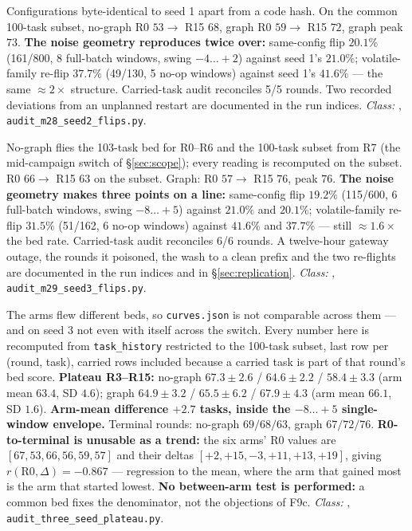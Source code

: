 \begin{description}[leftmargin=0pt,style=nextline,font=\normalfont,itemsep=6pt]
\item[\textbf{F44}\quad Replication, seed 2, both arms 16/16.]
Configurations byte-identical to seed 1 apart from a code hash. On the
common 100-task subset, no-graph R0 $53 \to$ R15 $68$, graph R0 $59 \to$
R15 $72$, graph peak $73$.
\textbf{The noise geometry reproduces twice over:} same-config
flip $20.1\%$ (161/800, 8 full-batch windows, swing $-4\ldots{+}2$)
against seed 1's $21.0\%$; volatile-family re-flip $37.7\%$ (49/130, 5
no-op windows) against seed 1's $41.6\%$ --- the same $\approx 2\times$
structure.
Carried-task audit reconciles 5/5 rounds. Two recorded deviations from an
unplanned restart are documented in the run indices.
\emph{Class:} , \texttt{audit\_m28\_seed2\_flips.py}.

\item[\textbf{F45}\quad Replication, seed 3, both arms 16/16.]
No-graph flies the 103-task bed for R0--R6 and the 100-task subset from R7
(the mid-campaign switch of \S\ref{sec:scope}); every reading is recomputed
on the subset. R0 $66 \to$ R15 $63$ on the subset. Graph: R0 $57 \to$ R15
$76$, peak $76$. \textbf{The noise geometry makes three points on a line:}
same-config flip $19.2\%$ (115/600, 6 full-batch windows, swing
$-8\ldots{+}5$) against $21.0\%$ and $20.1\%$; volatile-family re-flip
$31.5\%$ (51/162, 6 no-op windows) against $41.6\%$ and $37.7\%$ --- still
$\approx 1.6\times$ the bed rate. Carried-task audit reconciles 6/6 rounds.
A twelve-hour gateway outage, the rounds it poisoned, the wash to a clean
prefix and the two re-flights are documented in the run indices and in
\S\ref{sec:replication}. \emph{Class:} ,
\texttt{audit\_m29\_seed3\_flips.py}.

\item[\textbf{F46}\quad Three seeds $\times$ two arms on one bed.]
The arms flew different beds, so \texttt{curves.json} is not comparable
across them --- and on seed 3 not even with itself across the switch. Every
number here is recomputed from \texttt{task\_history} restricted to the
100-task subset, last row per (round, task), carried rows included because
a carried task is part of that round's bed score. \textbf{Plateau R3--R15:}
no-graph $67.3 \pm 2.6$ / $64.6 \pm 2.2$ / $58.4 \pm 3.3$ (arm mean
$63.4$, SD $4.6$); graph $64.9 \pm 3.2$ / $65.5 \pm 6.2$ / $67.9 \pm 4.3$
(arm mean $66.1$, SD $1.6$). \textbf{Arm-mean difference $+2.7$ tasks,
inside the $-8\ldots{+}5$ single-window envelope.} Terminal rounds:
no-graph $69/68/63$, graph $67/72/76$. \textbf{R0-to-terminal is unusable
as a trend:} the six arms' R0 values are $[67, 53, 66, 56, 59, 57]$ and
their deltas $[+2, +15, -3, +11, +13, +19]$, giving
$r(\text{R0}, \Delta) = -0.867$ --- regression to the mean, where the arm
that gained most is the arm that started lowest. \textbf{No between-arm
test is performed:} a common bed fixes the denominator, not the objections
of F9c. \emph{Class:} , \texttt{audit\_three\_seed\_plateau.py}.


\end{description}
